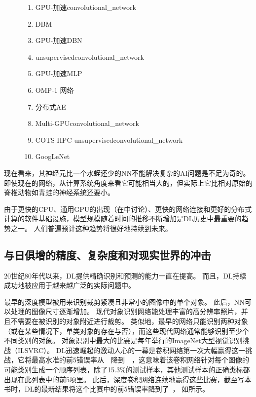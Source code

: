 \begin{figure}[!htb]
{\begin{enumerate}
  \item %
    GPU-加速\gls{convolutional_network}~\citep{chellapilla:inria-00112631}
  \item %
    \gls{DBM}~\citep{SalHinton09}
  \item %
    GPU-加速\gls{DBN}~\citep{RainaICML09}
  \item %
    \gls{unsupervised}\gls{convolutional_network}~\citep{Jarrett-ICCV2009-small}
  \item %
    GPU-加速\gls{MLP}~\citep{Ciresan-2010}
  \item %
    OMP-1 网络~\citep{Coates2011b}
  \item %
    分布式\gls{AE}~\citep{QuocLe-ICML2012}
  \item %
    Multi-GPU\gls{convolutional_network}~\citep{Krizhevsky-2012-small}
  \item %
    COTS HPC \gls{unsupervised}\gls{convolutional_network}~\citep{icml2013_coates13}
  \item %
    GoogLeNet~\citep{Szegedy-et-al-arxiv2014}
\end{enumerate}
}
\end{figure}


现在看来，其神经元比一个水蛭还少的\gls{NN}不能解决复杂的\gls{AI}问题是不足为奇的。
即使现在的网络，从计算系统角度来看它可能相当大的，但实际上它比相对原始的脊椎动物如青蛙的神经系统还要小。

由于更快的CPU、通用GPU的出现（在中讨论）、更快的网络连接和更好的分布式计算的软件基础设施，模型规模随着时间的推移不断增加是\gls{DL}历史中最重要的趋势之一。
人们普遍预计这种趋势将很好地持续到未来。


\subsection{与日俱增的精度、复杂度和对现实世界的冲击}
\label{sec:increasing_accuracy_complexity_and_real_world_impact}

20世纪80年代以来，\gls{DL}提供精确识别和预测的能力一直在提高。
而且，\gls{DL}持续成功地被应用于越来越广泛的实际问题中。

最早的深度模型被用来识别裁剪紧凑且非常小的图像中的单个对象\citep{Rumelhart86}。
此后，\gls{NN}可以处理的图像尺寸逐渐增加。
现代对象识别网络能处理丰富的高分辨率照片，并且不需要在被识别的对象附近进行裁剪\citep{Krizhevsky-2012}。
类似地，最早的网络只能识别两种对象（或在某些情况下，单类对象的存在与否），而这些现代网络通常能够识别至少个不同类别的对象。
对象识别中最大的比赛是每年举行的ImageNet大型视觉识别挑战（ILSVRC）。
\gls{DL}迅速崛起的激动人心的一幕是卷积网络第一次大幅赢得这一挑战，它将最高水准的前5错误率从~~降到~~\citep{Krizhevsky-2012}，这意味着该卷积网络针对每个图像的可能类别生成一个顺序列表，除了15.3\%的测试样本，其他测试样本的正确类标都出现在此列表中的前5项里。
此后，深度卷积网络连续地赢得这些比赛，截至写本书时，\gls{DL}的最新结果将这个比赛中的前5错误率降到了~， 如所示。

